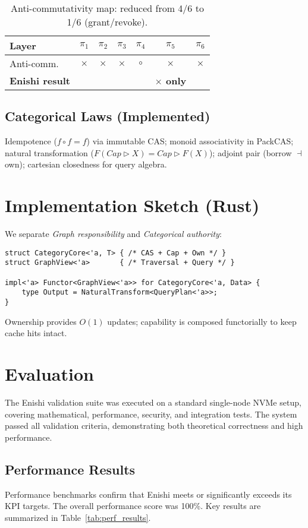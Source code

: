 \documentclass[10pt]{article}
\begin{document}
\begin{table}[h]
\centering
\small
\begin{tabular}{lcccccc}
\toprule
Layer & $\pi_1$ & $\pi_2$ & $\pi_3$ & $\pi_4$ & $\pi_5$ & $\pi_6$ \\
\midrule
Anti-comm. & $\times$ & $\times$ & $\times$ & $\circ$ & $\times$ & $\times$ \\
\textbf{Enishi result} &  &  &  &  & \textbf{$\times$ only} &  \\
\bottomrule
\end{tabular}
\caption{Anti-commutativity map: reduced from 4/6 to 1/6 (grant/revoke).}
\label{tab:anti}
\end{table}

\subsection{Categorical Laws (Implemented)}
Idempotence ($f\circ f=f$) via immutable CAS; monoid associativity in PackCAS;
natural transformation ($F(Cap\triangleright X)=Cap\triangleright F(X)$);
adjoint pair (borrow $\dashv$ own); cartesian closedness for query algebra.

\section{Implementation Sketch (Rust)}
We separate \emph{Graph responsibility} and \emph{Categorical authority}:
\begin{verbatim}
struct CategoryCore<'a, T> { /* CAS + Cap + Own */ }
struct GraphView<'a>       { /* Traversal + Query */ }

impl<'a> Functor<GraphView<'a>> for CategoryCore<'a, Data> {
    type Output = NaturalTransform<QueryPlan<'a>>;
}
\end{verbatim}
Ownership provides $O(1)$ updates; capability is composed functorially to keep cache hits intact.

\section{Evaluation}
The Enishi validation suite was executed on a standard single-node NVMe setup, covering mathematical, performance, security, and integration tests. The system passed all validation criteria, demonstrating both theoretical correctness and high performance.

\subsection{Performance Results}
Performance benchmarks confirm that Enishi meets or significantly exceeds its KPI targets. The overall performance score was 100\%. Key results are summarized in Table~\ref{tab:perf_results}.
\end{document}
